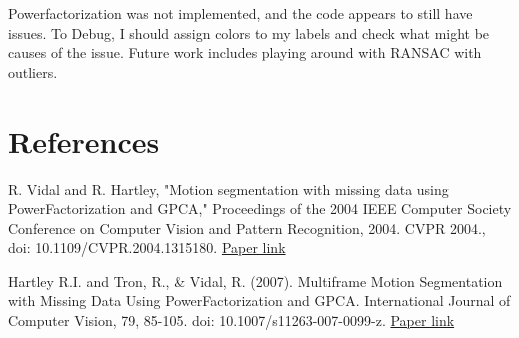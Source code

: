 \documentclass[a4paper]{article}
\begin{document}
Powerfactorization was not implemented, and the code appears to still have
issues. To Debug, I should assign colors to my labels and check what might be
causes of the issue.
Future work includes playing around with RANSAC with outliers.


\section{References}

 
R. Vidal and R. Hartley, "Motion segmentation with missing data using
PowerFactorization and GPCA," Proceedings of the 2004 IEEE Computer Society
Conference on Computer Vision and Pattern Recognition, 2004. CVPR 2004., doi:
10.1109/CVPR.2004.1315180.
\href{http://vision.jhu.edu/assets/VidalCVPR04.pdf}{Paper link}

\bigskip

\noindent 
Hartley R.I. and Tron, R., \& Vidal, R. (2007). Multiframe Motion Segmentation
with Missing Data Using PowerFactorization and GPCA. International Journal of
Computer Vision, 79, 85-105. doi: 10.1007/s11263-007-0099-z.
\href{https://pdfs.semanticscholar.org/322b/3feffe79585c112c6a0d86c05909634ac7c5.pdf}{Paper
link}





\end{document}
